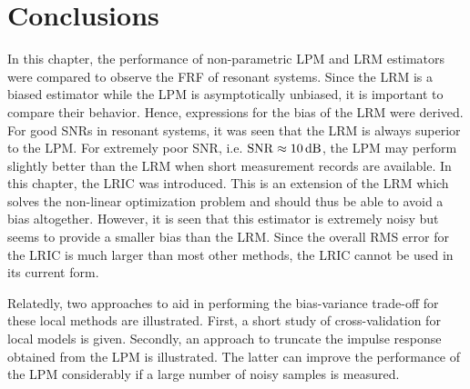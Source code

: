 \section{Conclusions}
\label{sec:conclusion}
In this chapter, the performance of non-parametric \gls{LPM} and \gls{LRM} estimators were compared to observe the \gls{FRF} of resonant systems.
Since the \gls{LRM} is a biased estimator while the \gls{LPM} is asymptotically unbiased, it is important to compare their behavior.
Hence, expressions for the bias of the \gls{LRM} were derived.
For good \glspl{SNR} in resonant systems, it was seen that the \gls{LRM} is always superior to the \gls{LPM}.
For extremely poor \gls{SNR}, i.e. $\mathrm{SNR} \approx 10\,\mathrm{dB}$, the \gls{LPM} may perform slightly better than the \gls{LRM} when short measurement records are available.
In this chapter, the \gls{LRIC} was introduced.
This is an extension of the \gls{LRM} which solves the non-linear optimization problem and should thus be able to avoid a bias altogether.
However, it is seen that this estimator is extremely noisy but seems to provide a smaller bias than the \gls{LRM}.
Since the overall \gls{RMS} error for the \gls{LRIC} is much larger than most other methods, the \gls{LRIC} cannot be used in its current form.

Relatedly, two approaches to aid in performing the bias-variance trade-off for these local methods are illustrated.
First, a short study of cross-validation for local models is given.
Secondly, an approach to truncate the impulse response obtained from the \gls{LPM} is illustrated.
The latter can improve the performance of the \gls{LPM} considerably if a large number of noisy samples is measured.


% 
